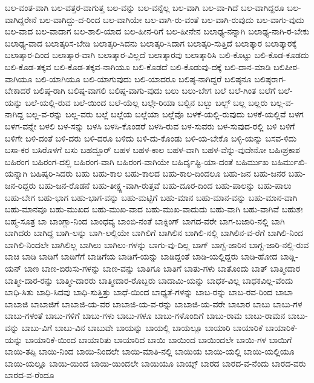 {ಬಲ-ವಂತ-ವಾಗಿ
ಬಲ-ವತ್ತರ-ವಾಗುತ್ತ
ಬಲ-ವನ್ನು
ಬಲ-ವನ್ನೆಲ್ಲ
ಬಲ-ವಾಗಿ
ಬಲ-ವಾ-ಗಿದೆ
ಬಲ-ವಾಗಿದ್ದರೂ
ಬಲ-ವಾಗಿದ್ದರೇನೆ
ಬಲ-ವಾಗಿದ್ದು-ದ-ರಿಂದ
ಬಲ-ವಾಗಿಯೇ
ಬಲ-ವಾಗಿ-ರು-ವಂತೆ
ಬಲ-ವಾಗಿ-ರುವುದು
ಬಲ-ವಾಗು-ವುದು
ಬಲ-ವಾದ
ಬಲ-ವಾದಾಗ
ಬಲ-ಶಾಲಿ-ಯಾದ
ಬಲ-ಹೀನ-ರಿಗೆ
ಬಲ-ಹೀನೇನ
ಬಲಾಢ್ಯ-ನನ್ನಾಗಿ
ಬಲಾಢ್ಯ-ನಾಗಿ-ರ-ಬೇಕು
ಬಲಾಢ್ಯ-ವಾದ
ಬಲಾತ್ಕರಿಸ-ಬೇಡಿ
ಬಲಾತ್ಕರಿ-ಸಿದನು
ಬಲಾತ್ಕರಿ-ಸಿದಾಗ
ಬಲಾತ್ಕರಿ-ಸುತ್ತಿದೆ
ಬಲಾತ್ಕಾರ
ಬಲಾತ್ಕಾರಕ್ಕೆ
ಬಲಾತ್ಕಾರ-ದಿಂದ
ಬಲಾತ್ಕಾರ-ವಾಗಿ
ಬಲಾತ್ಕಾರ-ವಿಲ್ಲದೆ
ಬಲಾತ್ಕಾರವು
ಬಲಾತ್ಕಾರಿಸಿ
ಬಲಿ-ಕೊಟ್ಟು
ಬಲಿ-ಕೊಡ-ಕೂಡದು
ಬಲಿ-ಕೊಡ-ತಕ್ಕವ
ಬಲಿ-ಕೊಡ-ತಕ್ಕವ-ನಾಗಿಯೂ
ಬಲಿ-ಕೊಡದೆ
ಬಲಿ-ಕೊಡುವು-ದಕ್ಕೆ
ಬಲಿ-ದಾನ-ಮಾಡಿ
ಬಲಿಪೀಠ-ವಾಗಿಯೂ
ಬಲಿ-ಯಾಗಿಯೂ
ಬಲಿ-ಯಾಗುವುದು
ಬಲಿ-ಯಾದರೂ
ಬಲಿಷ್ಠ-ನಾಗಿದ್ದರೆ
ಬಲಿಷ್ಠನೂ
ಬಲಿಷ್ಠರಾಗ-ಬೇಕಾದರೆ
ಬಲಿಷ್ಠ-ರಾಗಿ
ಬಲಿಷ್ಠ-ವಾಗಲಿ
ಬಲಿಷ್ಠ-ವಾಗು-ವುದು
ಬಲು
ಬಲು-ಬೇಗ
ಬಲೆ
ಬಲೆ-ಗಿಂತ
ಬಲೆಗೆ
ಬಲೆ-ಯನ್ನು
ಬಲೆ-ಯಲ್ಲಿ-ರುವ
ಬಲೆ-ಯಿಂದ
ಬಲೆ-ಯೆಲ್ಲ
ಬಲ್ಗೇ-ರಿಯಾ
ಬಲ್ಬಿನ
ಬಲ್ಬು
ಬಲ್ಬ್
ಬಲ್ಲ
ಬಲ್ಲರು
ಬಲ್ಲ-ವ-ನಾಗಿದ್ದ
ಬಲ್ಲ-ವ-ರನ್ನು
ಬಲ್ಲ-ವರು
ಬಲ್ಲೆ
ಬಲ್ಲೆಯ
ಬಲ್ಲೆಯಾ
ಬಲ್ಲೆವೊ
ಬಳಕೆ-ಯಲ್ಲಿ-ರುವುದು
ಬಳಕೆ-ಯಲ್ಲಿವೆ
ಬಳಗ
ಬಳಗ-ವನ್ನೇ
ಬಳಲಿ
ಬಳ-ಸನ್ನು
ಬಳಸಿ
ಬಳಸಿ-ಕೊಂಡರೆ
ಬಳಸಿ-ರುವ
ಬಳ-ಸುವರು
ಬಳ-ಸುವುದ-ರಲ್ಲಿ
ಬಳಿ
ಬಳಿಗೆ
ಬಳಿಗೇ
ಬಳಿ-ದಂತೆ
ಬಳಿ-ದರು
ಬಳಿ-ದರೂ
ಬಳಿದು
ಬಳಿ-ದು-ಕೊಂಡು
ಬಳಿ-ಯ-ಬೇಕೊ
ಬಳ್ಳಿ-ಯನ್ನು
ಬಸವ-ಳಿದು
ಬಸಾ-ಕರ
ಬಸಿರೊಳಗೆ
ಬಸು
ಬಹದ್ದೂರ್
ಬಹಳ
ಬಹಳ-ಕಾಲ
ಬಹಳ-ವಾಗಿ
ಬಹಳ-ವೆನ್ನು-ವುದೇನೋ
ಬಹಿಃಪ್ರಕಾಶ
ಬಹಿರಂಗ
ಬಹಿರಂಗ-ದಲ್ಲಿ
ಬಹಿರಂಗ-ವಾಗಿ
ಬಹಿರಂಗ-ವಾಗಿಯೇ
ಬಹಿರ್ದೃಷ್ಟಿ-ಯಾ-ದಂತೆ
ಬಹಿರ್ಮುಖ
ಬಹಿರ್ಮುಖಿ-ಯನ್ನಾಗಿ
ಬಹಿಷ್ಕರಿ-ಸಿದರು
ಬಹು
ಬಹು-ಕಾಲ
ಬಹು-ಕಾಲದ
ಬಹು-ಕಾಲ-ದಿಂದಲೂ
ಬಹು-ಜನ
ಬಹು-ಜನರ
ಬಹು-ಜನ-ರಿದ್ದರು
ಬಹು-ಜನ-ರೊಡನೆ
ಬಹು-ತೀಕ್ಷ್ಣ-ವಾಗಿ-ರುತ್ತವೆ
ಬಹು-ದೂರ-ದಿಂದ
ಬಹು-ಪಾಲನ್ನು
ಬಹು-ಪಾಲು
ಬಹು-ಬೇಗ
ಬಹು-ಭಾಗ
ಬಹು-ಭಾಗ-ವನ್ನು
ಬಹು-ಮಟ್ಟಿಗೆ
ಬಹು-ಮಾನ
ಬಹು-ಮಾನ-ವನ್ನು
ಬಹು-ಮಾನ-ವಾಗಿ
ಬಹು-ಮಾನವೂ
ಬಹು-ಮುಖದ
ಬಹು-ಮುಖ-ವಾದ
ಬಹು-ಮುಖ-ವಾದುದು
ಬಹು-ವಾಗಿ
ಬಹು-ವಾಗಿವೆ
ಬಹುಶಃ
ಬಹ್ಮ-ಸೂತ್ರ
ಬಾ
ಬಾಂಗ್ಲಾ-ನಿಂದ
ಬಾಂಧವ್ಯ
ಬಾಂಬಿ-ನಂತೆ
ಬಾಕ್ಸಿಂಗ್
ಬಾಗದ-ವರೇ
ಬಾಗ-ಬಜಾರಿ-ನಲ್ಲಿ
ಬಾಗಿ
ಬಾಗಿದರು
ಬಾಗಿದ್ದ
ಬಾಗಿ-ಲನ್ನು
ಬಾಗಿ-ಲಲ್ಲಿಯೇ
ಬಾಗಿಲಿಗೆ
ಬಾಗಿಲಿನ
ಬಾಗಿಲಿ-ನಲ್ಲಿ
ಬಾಗಿಲಿನ-ವ-ರೆಗೆ
ಬಾಗಿಲಿ-ನಿಂದ
ಬಾಗಿಲಿ-ನಿಂದಲೇ
ಬಾಗಿಲಿಲ್ಲ
ಬಾಗಿಲು
ಬಾಗಿಲು-ಗಳನ್ನು
ಬಾಗು-ವು-ದಿಲ್ಲ
ಬಾಗ್
ಬಾಗ್ಬ-ಜಾರಿನ
ಬಾಗ್ಬ-ಜಾರಿ-ನಲ್ಲಿ-ರುವ
ಬಾಚಿ
ಬಾಡಿ
ಬಾಡಿಗೆ
ಬಾಡಿಗೆಗೆ
ಬಾಡಿಗೆಯ
ಬಾಡಿಗೆ-ಯನ್ನು
ಬಾಡಿದ್ದಂತೆ
ಬಾಡಿ-ಯಲ್ಲಿದ್ದರು
ಬಾಡಿ-ಹೋದ
ಬಾಡ್ಲಿ-ಯನ್
ಬಾಣ
ಬಾಣ-ಬಿರುಸು-ಗಳನ್ನು
ಬಾಣ-ವನ್ನು
ಬಾತಿಗೂ
ಬಾತಿಗೆ
ಬಾತು-ಗಳು
ಬಾತೊಂದು
ಬಾತ್
ಬಾತ್ಮೀದಾರ
ಬಾತ್ಮೀ-ದಾರ-ರನ್ನು
ಬಾತ್ಮೀ-ದಾರರು
ಬಾತ್ಮೀದಾರ-ರೊಬ್ಬರು
ಬಾದಾಮಿ-ಯನ್ನು
ಬಾಧಕ-ವಿಲ್ಲ
ಬಾಧಕವಿಲ್ಲ-ವೆಂದು
ಬಾಧಿ-ಸಿತು
ಬಾಧಿ-ಸಿದವು
ಬಾಧಿ-ಸುತ್ತಿತ್ತು
ಬಾಧೆ-ಯಿಂದ
ಬಾಧ್ಯತೆ-ಗಳನ್ನು
ಬಾಬ-ರನ್ನು
ಬಾಬ-ರವ-ರಿಂದ
ಬಾಬಾ
ಬಾಬಾಜಿ
ಬಾಬಾಜಿಗೆ
ಬಾಬಾಜಿ-ಯ-ವರ
ಬಾಬಾಜಿ-ಯ-ವ-ರನ್ನು
ಬಾಬಾಜಿ-ಯ-ವರೇ
ಬಾಬಾರ
ಬಾಬು
ಬಾಬು-ಗಳ
ಬಾಬು-ಗಳಂತೆ
ಬಾಬು-ಗಳಿಗೆ
ಬಾಬು-ಗಳು
ಬಾಬು-ಗಳೂ
ಬಾಬು-ಗಳೊಂದಿಗೆ
ಬಾಬು-ರಾಮ
ಬಾಬು-ರಾಮನ
ಬಾಬು-ವನ್ನು
ಬಾಬು-ವಿಗೆ
ಬಾಬು-ವಿನ
ಬಾಬುವೇ
ಬಾಯನ್ನು
ಬಾಯಲ್ಲಿ
ಬಾಯಲ್ಲೂ
ಬಾಯಾರಿ
ಬಾಯಾರಿಕೆ
ಬಾಯಾರಿಕೆ-ಯನ್ನು
ಬಾಯಾರಿಕೆ-ಯಿಂದ
ಬಾಯಾರಿತು
ಬಾಯಾರಿದ
ಬಾಯಿ
ಬಾಯಿಂದ
ಬಾಯಿಂದಲೇ
ಬಾಯಿ-ಗಳ
ಬಾಯಿಗೆ
ಬಾಯಿ-ತಪ್ಪಿ
ಬಾಯಿ-ನಿಂದ
ಬಾಯಿ-ನಿಂದಲೇ
ಬಾಯಿ-ಮಾತಿ-ನಲ್ಲಿ
ಬಾಯಿಯ
ಬಾಯಿ-ಯಲ್ಲಿ
ಬಾಯಿ-ಯಲ್ಲಿಯೂ
ಬಾಯಿ-ಯಲ್ಲೂ
ಬಾಯಿ-ಯಿಂದ
ಬಾಯಿ-ಯಿಂದಲೇ
ಬಾಯಿಯೂ
ಬಾಯ್ಸ್
ಬಾರದ
ಬಾರದ-ವ-ನೆಂದು
ಬಾರದ-ವರು
ಬಾರದ-ವ-ರೆಂದೂ
}
